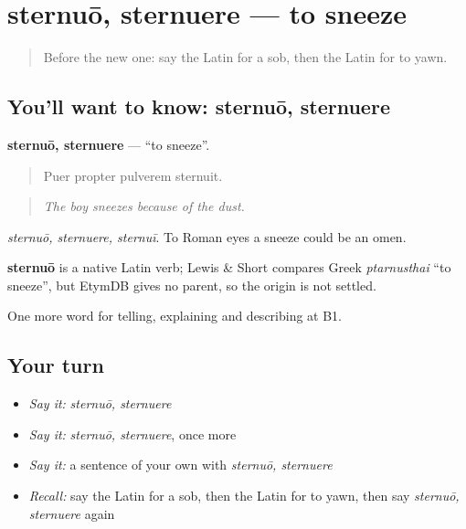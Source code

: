 \section[sternuō, sternuere]{sternuō, sternuere — to sneeze}

\label{lesson:LA-C520-sternuo}



\begin{quote}
Before the new one: say the Latin for a sob, then the Latin for to yawn.
\end{quote}

\subsection*{You'll want to know: sternuō, sternuere}
\textbf{sternuō, sternuere} — \textquotedblleft{}to sneeze\textquotedblright{}.

\begin{quote}
Puer propter pulverem sternuit.
\end{quote}

\begin{quote}
\emph{The boy sneezes because of the dust.}
\end{quote}

\emph{sternuō, sternuere, sternuī}. To Roman eyes a sneeze could be an omen.

\begin{cousinweb}
\textbf{sternuō} is a native Latin verb; Lewis \& Short compares Greek \emph{ptarnusthai} \textquotedblleft{}to sneeze\textquotedblright{}, but EtymDB gives no parent, so the origin is not settled.
\end{cousinweb}

\begin{grammarlens}[title={What you've built}]
One more word for telling, explaining and describing at B1.
\end{grammarlens}

\subsection*{Your turn}
\begin{itemize}
\raggedright
  \item \emph{Say it:} \emph{sternuō, sternuere}
  \item \emph{Say it:} \emph{sternuō, sternuere}, once more
  \item \emph{Say it:} a sentence of your own with \emph{sternuō, sternuere}
  \item \emph{Recall:} say the Latin for a sob, then the Latin for to yawn, then say \emph{sternuō, sternuere} again
\end{itemize}

